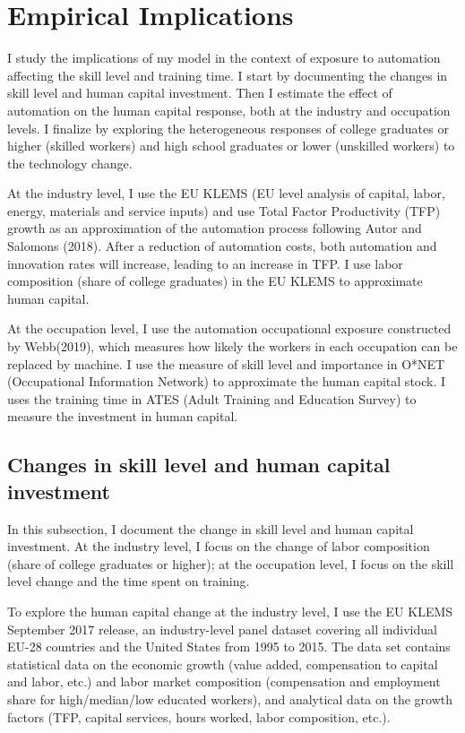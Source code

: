 \documentclass[12pt]{article}
\begin{document}
\section{Empirical Implications}
I study the implications of my model in the context of exposure to automation affecting the skill level and training time. I start by documenting the changes in skill level and human capital investment. Then I estimate the effect of automation on the human capital response, both at the industry and occupation levels. I finalize by exploring the heterogeneous responses of college graduates or higher (skilled workers) and high school graduates or lower (unskilled workers) to the technology change. 

At the industry level, I use the EU KLEMS (EU level analysis of capital, labor, energy, materials and service inputs) and use Total Factor Productivity (TFP) growth as an approximation of the automation process following Autor and Salomons (2018)\nocite{AutorSalomons2018}. After a reduction of automation costs, both automation and innovation rates will increase, leading to an increase in TFP. I use labor composition (share of college graduates) in the EU KLEMS to approximate human capital. 

At the occupation level, I use the automation occupational exposure constructed by Webb(2019)\nocite{Webb2019}, which measures how likely the workers in each occupation can be replaced by machine. I use the measure of skill level and importance in O*NET (Occupational Information Network) to approximate the human capital stock. I uses the training time in ATES (Adult Training and Education Survey) to measure the investment in human capital. 

\subsection{Changes in skill level and human capital investment}
In this subsection, I document the change in skill level and human capital investment. At the industry level, I focus on the change of labor composition (share of college graduates or higher); at the occupation level, I focus on the skill level change and the time spent on training. 
 
To explore the human capital change at the industry level, I use the EU KLEMS September 2017 release, an industry-level panel dataset covering all individual EU-28 countries and the United States from 1995 to 2015. The data set contains statistical data on the economic growth (value added, compensation to capital and labor, etc.) and labor market composition (compensation and employment share for high/median/low educated workers), and analytical data on the growth factors (TFP, capital services, hours worked, labor composition, etc.). 
\end{document}
